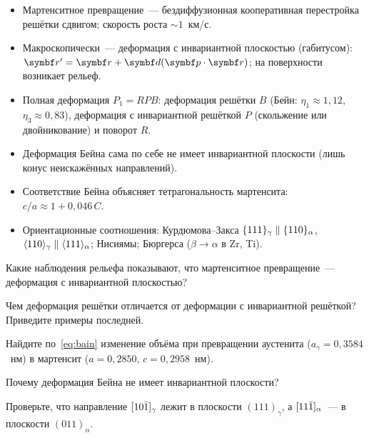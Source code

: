 \begin{itogi}
\begin{itemize}
\item Мартенситное превращение~— бездиффузионная кооперативная
перестройка решётки сдвигом; скорость роста $\sim1$~км/с.
\item Макроскопически~— деформация с инвариантной плоскостью (габитусом):
$\vb r'=\vb r+\vb d(\vb p\cdot\vb r)$; на поверхности возникает рельеф.
\item Полная деформация $P_1=RPB$: деформация решётки $B$ (Бейн:
$\eta_1\approx1{,}12$, $\eta_3\approx0{,}83$), деформация с инвариантной
решёткой $P$ (скольжение или двойникование) и поворот $R$.
\item Деформация Бейна сама по себе не имеет инвариантной плоскости
(лишь конус неискажённых направлений).
\item Соответствие Бейна объясняет тетрагональность мартенсита:
$c/a\approx1+0{,}046\,C$.
\item Ориентационные соотношения: Курдюмова--Закса
$\{111\}_\gamma\parallel\{110\}_\alpha$,
$\langle 110\rangle_\gamma\parallel\langle 111\rangle_\alpha$; Нисиямы; Бюргерса
($\beta\to\alpha$ в Zr, Ti).
\end{itemize}
\end{itogi}

\begin{proverka}
\item Какие наблюдения рельефа показывают, что мартенситное превращение~—
деформация с инвариантной плоскостью?
\item Чем деформация решётки отличается от деформации с инвариантной
решёткой? Приведите примеры последней.
\item Найдите по~\eqref{eq:bain} изменение объёма при превращении аустенита
($a_\gamma=0{,}3584$~нм) в мартенсит ($a=0{,}2850$, $c=0{,}2958$~нм).
\item Почему деформация Бейна не имеет инвариантной плоскости?
\item Проверьте, что направление $[10\bar{1}]_\gamma$ лежит в плоскости
$(111)_\gamma$, а $[11\bar{1}]_\alpha$~— в плоскости $(011)_\alpha$.
\end{proverka}
